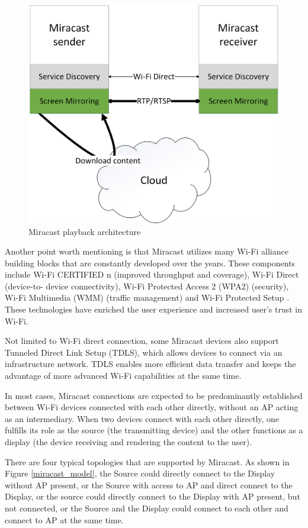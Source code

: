 \begin{figure}[htb] 
\centering \includegraphics[width=0.7\columnwidth]{charts/miracast} 
\caption{Miracast playback architecture\label{miracast_use_scenario}} 
\end{figure}  

Another point worth mentioning is that Miracast utilizes many Wi-Fi alliance
building blocks that are constantly developed over the years. These components
include Wi-Fi CERTIFIED n (improved throughput and coverage), Wi-Fi Direct
(device-to- device connectivity), Wi-Fi Protected Access 2 (WPA2) (security),
Wi-Fi Multimedia (WMM) (traffic management) and Wi-Fi Protected
Setup \cite{miracast_industry}. These technologies have enriched the user
experience and increased user's trust in Wi-Fi.

Not limited to Wi-Fi direct connection, some Miracast devices also support Tunneled Direct Link Setup (TDLS), which allows devices to connect via an infrastructure network. TDLS enables more efficient data transfer and keeps the advantage of more advanced Wi-Fi capabilities at the same time.

In most cases, Miracast connections are expected to be predominantly established
between Wi-Fi devices connected with each other directly, without an AP acting
as an intermediary. When two devices connect with each other directly, one fulfills its role as the source (the transmitting device) and the other functions as a display (the device receiving and rendering the content to the user).

There are four typical topologies that are supported by Miracast. As shown in
Figure \ref{miracast_model}, the Source could directly connect to the Display
without AP present, or the Source with access to AP and direct connect to the Display, or the source could directly
connect to the Display with AP present, but not connected, or the Source and
the Display could connect to each other and connect to AP at the same time.

